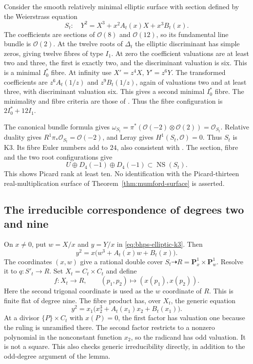 Consider the smooth relatively minimal elliptic surface with section
defined by the Weierstrass equation
\begin{equation}
 S_t:\quad Y^2=X^3+x^2A_t(x)X+x^3B_t(x).
 \label{eq:bhps-elliptic-k3}
\end{equation}
The coefficients are sections of $\mathcal O(8)$ and $\mathcal O(12)$,
so its fundamental line bundle is $\mathcal O(2)$.
At the twelve roots of $\Delta_t$ the elliptic discriminant has
simple zeros, giving twelve fibres of type $I_1$.
At zero the coefficient valuations are at least two and three,
the first is exactly two, and the discriminant valuation is six.
This is a minimal $I_0^*$ fibre.
At infinity use $X'=z^4X$, $Y'=z^6Y$.
The transformed coefficients are $z^6A_t(1/z)$ and $z^9B_t(1/z)$,
again of valuations two and at least three, with discriminant
valuation six.  This gives a second minimal $I_0^*$ fibre.
The minimality and fibre criteria are those of
\cite[\S4.5, Table~1]{SchuttShioda}.
Thus the fibre configuration is $2I_0^*+12I_1$.

The canonical bundle formula
\cite[Theorem~6.8]{SchuttShioda} gives
$\omega_{S_t}=\pi^*(\mathcal O(-2)\otimes\mathcal O(2))
 =\mathcal O_{S_t}$.
Relative duality gives $R^1\pi_*\mathcal O_{S_t}=\mathcal O(-2)$,
and Leray gives $H^1(S_t,\mathcal O)=0$.
Thus $S_t$ is K3.  Its fibre Euler numbers add to $24$, also
consistent with \cite[Corollary~6.11]{SchuttShioda}.
The section, fibre and the two root configurations give
\[
 U\oplus D_4(-1)\oplus D_4(-1)
                       \subset\operatorname{NS}(S_t).
\]
This shows Picard rank at least ten.  No identification with the
Picard-thirteen real-multiplication surface of
Theorem~\ref{thm:mumford-surface} is asserted.

\subsection{The irreducible correspondence of degrees two and nine}

On $x\ne0$, put $w=X/x$ and $y=Y/x$ in
\eqref{eq:bhps-elliptic-k3}.  Then
\[
 y^2=x\bigl(w^3+A_t(x)w+B_t(x)\bigr).
\]
The coordinates $(x,w)$ give a rational double cover
$S_t\dashrightarrow R=\mathbf P^1_x\times\mathbf P^1_w$.
Resolve it to $q:S'_t\to R$.
Set $X_t=C_t\times C_t$ and define
\[
 f:X_t\longrightarrow R,\qquad
       (p_1,p_2)\longmapsto(x(p_1),x(p_2)).
\]
Here the second trigonal coordinate is used as the $w$ coordinate
of $R$.  This is finite flat of degree nine.
The fibre product has, over $X_t$, the generic equation
\[
 y^2=x_1\bigl(x_2^3+A_t(x_1)x_2+B_t(x_1)\bigr).
\]
At a divisor $\{P\}\times C_t$ with $x(P)=0$, the first factor
has valuation one because the ruling is unramified there.
The second factor restricts to a nonzero polynomial in the
nonconstant function $x_2$, so the radicand has odd valuation.
It is not a square.  This also checks generic irreducibility
directly, in addition to the odd-degree argument of the lemma.

